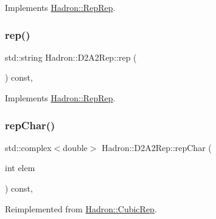 Implements \mbox{\hyperlink{structHadron_1_1RepRep_ab3213025f6de249f7095892109575fde}{Hadron\+::\+Rep\+Rep}}.

\mbox{\label{structHadron_1_1D2A2Rep_a6820f2acd27e1e6bcebbe430421b0e65}} 
\subsubsection{\texorpdfstring{rep()}{rep()}\hspace{0.1cm}{\footnotesize\ttfamily [3/3]}}
{\footnotesize\ttfamily std\+::string Hadron\+::\+D2\+A2\+Rep\+::rep (\begin{DoxyParamCaption}{ }\end{DoxyParamCaption}) const\hspace{0.3cm}{\ttfamily [inline]}, {\ttfamily [virtual]}}



Implements \mbox{\hyperlink{structHadron_1_1RepRep_ab3213025f6de249f7095892109575fde}{Hadron\+::\+Rep\+Rep}}.

\mbox{\label{structHadron_1_1D2A2Rep_a27712e402af9b022dee4cccf805ebe86}} 
\subsubsection{\texorpdfstring{repChar()}{repChar()}\hspace{0.1cm}{\footnotesize\ttfamily [1/2]}}
{\footnotesize\ttfamily std\+::complex$<$double$>$ Hadron\+::\+D2\+A2\+Rep\+::rep\+Char (\begin{DoxyParamCaption}\item[{int}]{elem }\end{DoxyParamCaption}) const\hspace{0.3cm}{\ttfamily [inline]}, {\ttfamily [virtual]}}



Reimplemented from \mbox{\hyperlink{structHadron_1_1CubicRep_af45227106e8e715e84b0af69cd3b36f8}{Hadron\+::\+Cubic\+Rep}}.

